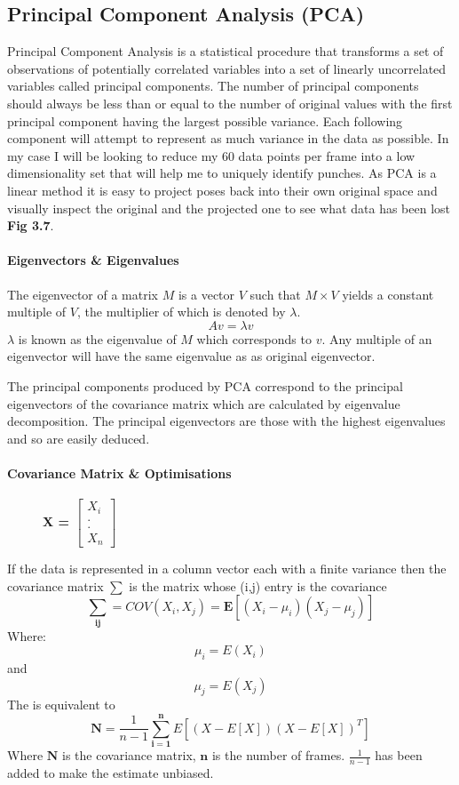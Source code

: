 \subsection{Principal Component Analysis (PCA)}
\label{subsec:subsec01}
Principal Component Analysis is a statistical procedure that transforms a set of observations of potentially correlated variables into a set of linearly uncorrelated variables called principal components. The number of principal components should always be less than or equal to the number of original values with the first principal component having the largest possible variance. Each following component will attempt to represent as much variance in the data as possible. In my case I will be looking to reduce my 60 data points per frame into a low dimensionality set that will help me to uniquely identify punches.
As PCA is a linear method it is easy to project poses back into their own original space and visually inspect the original and the projected one to see what data has been lost {\bf Fig 3.7}.

\paragraph{Eigenvectors \& Eigenvalues}
The eigenvector of a matrix $M$ is a vector $V$ such that $M\times V$ yields a constant multiple of $V$, the multiplier of which is denoted by $\lambda.$
$$Av = \lambda v$$
$\lambda$ is known as the eigenvalue of $M$ which corresponds to $v$. Any multiple of an eigenvector will have the same eigenvalue as as original eigenvector.

The principal components produced by PCA correspond to the principal eigenvectors of the covariance matrix which are calculated by eigenvalue decomposition. The principal eigenvectors are those with the highest eigenvalues and so are easily deduced. 

\paragraph{Covariance Matrix \& Optimisations }
\begin{figure}
\vspace{-15pt}
\hspace{15pt}
\bf{X = } $\begin{bmatrix} X_i\\.\\.\\X_n \end{bmatrix}$\newline
\end{figure}
If the data is represented in a column vector each with a finite variance then the covariance matrix $\mathbf{\sum}$ is the matrix whose (i,j) entry is the covariance
$$\mathbf{\sum_{ij}} = COV(X_i,X_j) = \mathbf{E}[(X_i - \mu_i )(X_j - \mu_j )]$$
Where:
$$\mu_i = E(X_i)$$ and $$\mu_j = E(X_j)$$
The is equivalent to $$\mathbf{N} = \frac{1}{n-1}\mathbf{\sum_{i=1}^n}E[(X-E[X])(X-E[X])^T]$$ 
Where $\mathbf{N}$ is the covariance matrix, $\mathbf{n}$ is the number of frames. $\frac{1}{n-1}$ has been added to make the estimate unbiased.

